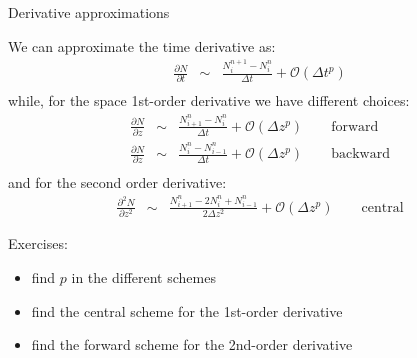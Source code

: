 \documentclass[9pt]{beamer}
\begin{document}
\begin{frame}{Derivative approximations}

We can approximate the time derivative as:
%
\begin{eqnarray*}
\frac{\partial N}{\partial t} & \sim & \frac{N_i^{n+1} - N_i^n}{\Delta t} + {\mathcal O}(\Delta t^p) \\
\end{eqnarray*}
%
while, for the space 1st-order derivative we have different choices:
%
\begin{eqnarray*}
\frac{\partial N}{\partial z} & \sim & \frac{N^n_{i+1} - N^n_i}{\Delta t} + {\mathcal O}(\Delta z^p) \qquad \text{forward}\\
\frac{\partial N}{\partial z} & \sim & \frac{N^n_i - N^{n}_{i-1}}{\Delta t} + {\mathcal O}(\Delta z^p) \qquad \text{backward} \\
\end{eqnarray*}
%
and for the second order derivative:
%
\begin{eqnarray*}
\frac{\partial^2 N}{\partial z^2} & \sim & \frac{N^n_{i+1} - 2N^n_i + N^{n}_{i-1}}{2 \Delta z^2} + {\mathcal O}(\Delta z^p) \qquad \text{central} 
\end{eqnarray*}

{\color{orange}Exercises:}
%
\begin{itemize}
\item find $p$ in the different schemes \\
\item find the central scheme for the 1st-order derivative \\
\item find the forward scheme for the 2nd-order derivative \\
\end{itemize}

\end{frame}
\end{document}
